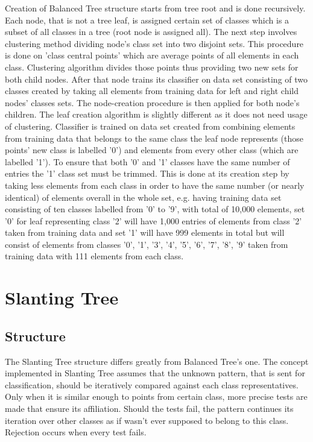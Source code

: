 Creation of Balanced Tree structure starts from tree root and is done recursively. Each node, that is not a tree leaf, is assigned certain set of classes which is a subset of all classes in a tree (root node is assigned all). The next step involves clustering method dividing node's class set into two disjoint sets. This procedure is done on 'class central points' which are average points of all elements in each class. Clustering algorithm divides those points thus providing two new sets for both child nodes. After that node trains its classifier on data set consisting of two classes created by taking all elements from training data for left and right child nodes' classes sets. The node-creation procedure is then applied for both node's children. The leaf creation algorithm is slightly different as it does not need usage of clustering. Classifier is trained on data set created from combining elements from training data that belongs to the same class the leaf node represents (those points' new class is labelled '0') and elements from every other class (which are labelled '1')\label{balanced_tree:one-vs-rest}. To ensure that both '0' and '1' classes have the same number of entries the '1' class set must be trimmed. This is done at its creation step by taking less elements from each class in order to have the same number (or nearly identical) of elements overall in the whole set, e.g. having training data set consisting of ten classes labelled from '0' to '9', with total of 10,000 elements, set '0' for leaf representing class '2' will have 1,000 entries of elements from class '2' taken from training data and set '1' will have 999 elements in total but will consist of elements from classes '0', '1', '3', '4', '5', '6', '7', '8', '9' taken from training data with 111 elements from each class.

\section{Slanting Tree}

\label{slanting_tree_description}

\subsection{Structure}

The Slanting Tree structure differs greatly from Balanced Tree's one. The concept implemented in Slanting Tree assumes that the unknown pattern, that is sent for classification, should be iteratively compared against each class representatives. Only when it is similar enough to points from certain class, more precise tests are made that ensure its affiliation. Should the tests fail, the pattern continues its iteration over other classes as if wasn't ever supposed to belong to this class. Rejection occurs when every test fails.

